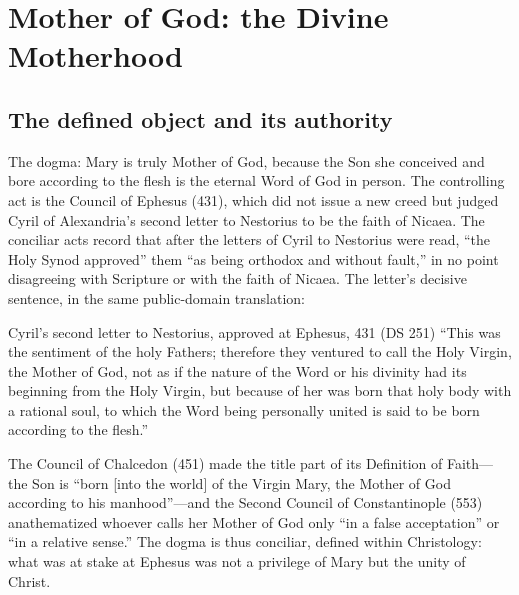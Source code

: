 \sectionguard
\section{Mother of God: the Divine Motherhood}

\subsection*{The defined object and its authority}

The dogma: Mary is truly Mother of God, because the Son she conceived and
bore according to the flesh is the eternal Word of God in person. The
controlling act is the Council of Ephesus (431), which did not issue a new
creed but judged Cyril of Alexandria's second letter to Nestorius to be
the faith of Nicaea. The conciliar acts record that after the letters of
Cyril to Nestorius were read, ``the Holy Synod approved'' them ``as being
orthodox and without fault,'' in no point disagreeing with Scripture or
with the faith of Nicaea. The letter's decisive sentence, in the same
public-domain translation:

\begin{definedtext}{Cyril's second letter to Nestorius, approved at
Ephesus, 431 (DS 251)}
``This was the sentiment of the holy Fathers; therefore they ventured to
call the Holy Virgin, the Mother of God, not as if the nature of the Word
or his divinity had its beginning from the Holy Virgin, but because of her
was born that holy body with a rational soul, to which the Word being
personally united is said to be born according to the
flesh.''
\end{definedtext}

The Council of Chalcedon (451) made the title part of its Definition of
Faith---the Son is ``born [into the world] of the Virgin Mary, the Mother
of God according to his manhood''---and the Second Council of
Constantinople (553) anathematized whoever calls her Mother of God only
``in a false acceptation'' or ``in a relative sense.''
The dogma is thus conciliar, defined within Christology: what was at stake
at Ephesus was not a privilege of Mary but the unity of Christ.

